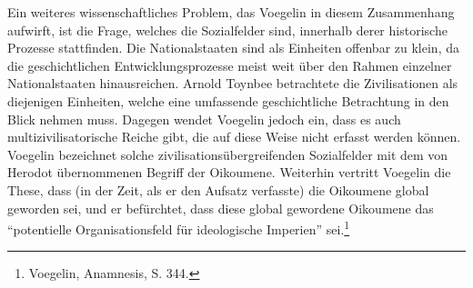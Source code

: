Ein weiteres wissenschaftliches Problem, das Voegelin in diesem Zusammenhang
aufwirft, ist die Frage, welches die Sozialfelder sind, innerhalb derer
historische Prozesse stattfinden. Die Nationalstaaten sind als Einheiten
offenbar zu klein, da die geschichtlichen Entwicklungsprozesse meist weit über
den Rahmen einzelner Nationalstaaten hinausreichen. Arnold Toynbee betrachtete
die Zivilisationen als diejenigen Einheiten, welche eine umfassende
geschichtliche Betrachtung in den Blick nehmen muss. Dagegen wendet Voegelin
jedoch ein, dass es auch multizivilisatorische Reiche gibt, die auf diese Weise
nicht erfasst werden können. Voegelin bezeichnet solche
zivilisationsübergreifenden Sozialfelder mit dem von Herodot übernommenen
Begriff der Oikoumene. Weiterhin vertritt Voegelin die These, dass (in der
Zeit, als er den Aufsatz verfasste) die Oikoumene global geworden sei, und er
befürchtet, dass diese global gewordene Oikoumene das "`potentielle
Organisationsfeld für ideologische Imperien"' sei.\footnote{Voegelin,
  Anamnesis, S. 344.}

